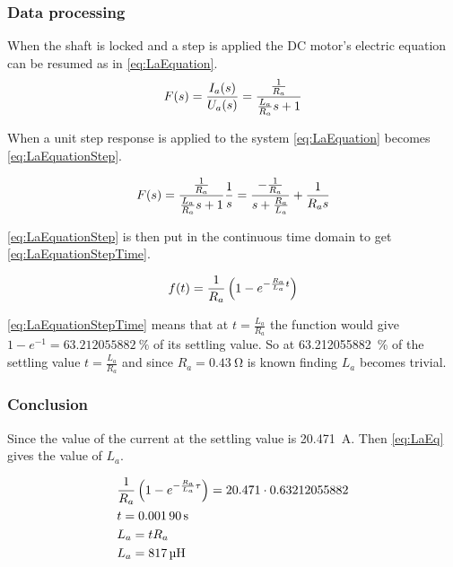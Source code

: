 \subsubsection*{Data processing}
When the shaft is locked and a step is applied the DC motor's electric equation can be resumed as in \autoref{eq:LaEquation}.
\begin{equation}
	F(s)=\frac{I_a(s)}{U_a(s)}=\frac{\frac{1}{R_a}}{\frac{L_a}{R_a} s+1} \addunit{1}
	\label{eq:LaEquation}
\end{equation}
\startexplain
{}
\stopexplain

When a unit step response is applied to the system \autoref{eq:LaEquation} becomes \autoref{eq:LaEquationStep}.

\begin{equation}
F(s)=\frac{\frac{1}{R_a}}{\frac{L_a}{R_a} s+1}\frac{1}{s}=\frac{-\frac{1}{R_a}}{s+\frac{R_a}{L_a}}+\frac{1}{R_a s} \addunit{1}
\label{eq:LaEquationStep}
\end{equation}

\autoref{eq:LaEquationStep} is then put in the continuous time domain to get \autoref{eq:LaEquationStepTime}.

\begin{equation}
f(t)= \frac{1}{R_a} \left(1-e^{-\frac{R_a}{L_a} t}\right) \addunit{1}
\label{eq:LaEquationStepTime}
\end{equation}

\autoref{eq:LaEquationStepTime} means that at $t=\frac{L_a}{R_a}$ the function would give $1-e^{-1}=\SI{63.212055882}{\percent}$ of its settling value. So at \SI{63.212055882}{\percent} of the settling value $t=\frac{L_a}{R_a}$ and since $R_a=\SI{0.43}{\ohm}$ \cite{datasheet:saradc} is known finding $L_a$ becomes trivial.

\subsubsection*{Conclusion}

Since the value of the current at the settling value is \SI{20.471}{\ampere}. Then \autoref{eq:LaEq} gives the value of $L_a$.

\begin{subequations} \label{eq:LaEq}
	\begin{flalign}
		&\frac{1}{R_a} \left(1-e^{-\frac{R_a}{L_a} \tau}\right)=20.471 \cdot 0.63212055882 \addunit{\second} \\
		&t = \SI{0.00190}{\second} \\
		&L_a=tR_a \\
		&L_a=\SI{817}{\micro\henry}
	\end{flalign}
\end{subequations}





